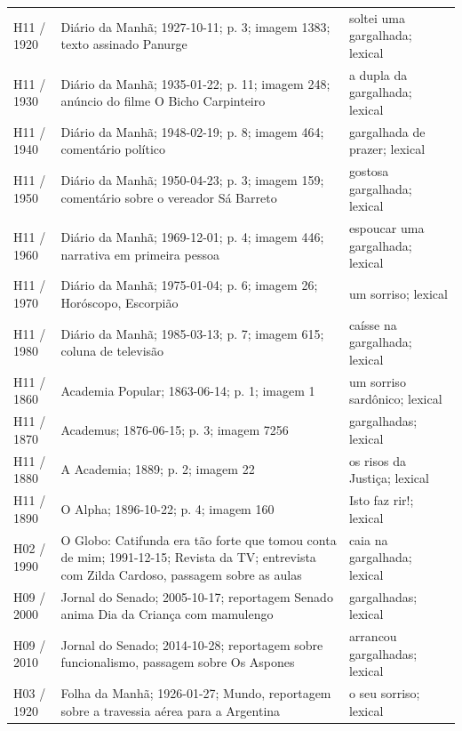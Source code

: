 \begin{longtable}{>{\raggedright\arraybackslash}p{}>{\raggedright\arraybackslash}p{}>{\raggedright\arraybackslash}p{}}
H11 / 1920 & Diário da Manhã; 1927-10-11; p. 3; imagem 1383; texto assinado Panurge & soltei uma gargalhada; lexical \cite{acervoD061} \\
H11 / 1930 & Diário da Manhã; 1935-01-22; p. 11; imagem 248; anúncio do filme O Bicho Carpinteiro & a dupla da gargalhada; lexical \cite{acervoD062} \\
H11 / 1940 & Diário da Manhã; 1948-02-19; p. 8; imagem 464; comentário político & gargalhada de prazer; lexical \cite{acervoD063} \\
H11 / 1950 & Diário da Manhã; 1950-04-23; p. 3; imagem 159; comentário sobre o vereador Sá Barreto & gostosa gargalhada; lexical \cite{acervoD064} \\
H11 / 1960 & Diário da Manhã; 1969-12-01; p. 4; imagem 446; narrativa em primeira pessoa & espoucar uma gargalhada; lexical \cite{acervoD065} \\
H11 / 1970 & Diário da Manhã; 1975-01-04; p. 6; imagem 26; Horóscopo, Escorpião & um sorriso; lexical \cite{acervoD066} \\
H11 / 1980 & Diário da Manhã; 1985-03-13; p. 7; imagem 615; coluna de televisão & caísse na gargalhada; lexical \cite{acervoD067} \\
H11 / 1860 & Academia Popular; 1863-06-14; p. 1; imagem 1 & um sorriso sardônico; lexical \cite{acervoD068} \\
H11 / 1870 & Academus; 1876-06-15; p. 3; imagem 7256 & gargalhadas; lexical \cite{acervoD069} \\
H11 / 1880 & A Academia; 1889; p. 2; imagem 22 & os risos da Justiça; lexical \cite{acervoD070} \\
H11 / 1890 & O Alpha; 1896-10-22; p. 4; imagem 160 & Isto faz rir!; lexical \cite{acervoD071} \\
H02 / 1990 & O Globo: Catifunda era tão forte que tomou conta de mim; 1991-12-15; Revista da TV; entrevista com Zilda Cardoso, passagem sobre as aulas & caia na gargalhada; lexical \cite{acervoD072} \\
H09 / 2000 & Jornal do Senado; 2005-10-17; reportagem Senado anima Dia da Criança com mamulengo & gargalhadas; lexical \cite{acervoD073} \\
H09 / 2010 & Jornal do Senado; 2014-10-28; reportagem sobre funcionalismo, passagem sobre Os Aspones & arrancou gargalhadas; lexical \cite{acervoD074} \\
H03 / 1920 & Folha da Manhã; 1926-01-27; Mundo, reportagem sobre a travessia aérea para a Argentina & o seu sorriso; lexical \cite{acervoD075} \\

\end{longtable}
